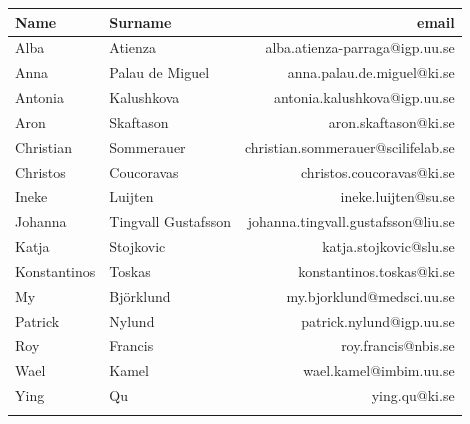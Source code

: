 \documentclass[12pt]{article}\usepackage[]{graphicx}\usepackage[]{color}
\makeatletter
\newcommand{\courseName}{ChIP-seq data analysis}
\newcommand{\courseLocation}{Stockholm}
\newcommand{\courseDate}{2018}
\newcommand{\courseLeaderA}{Olga Dethlefsen}
\newcommand{\courseEmailA}{olga.dethlefsen@nbis.se}
\newcommand{\courseLeaderB}{Agata Smialowska}
\newcommand{\courseEmailB}{agata.smialowska@nbis.se}
\makeatother
\begin{document}
\pagestyle{fancy}



% 

\newpage




\begin{table}[ht]
\centering
\begin{tabular}{llr}
  \toprule
Name & Surname & email \\ 
  \midrule
Alba & Atienza & alba.atienza-parraga@igp.uu.se \\ 
   \rowcolor[gray]{0.95}Anna & Palau de Miguel & anna.palau.de.miguel@ki.se \\ 
  Antonia & Kalushkova & antonia.kalushkova@igp.uu.se \\ 
   \rowcolor[gray]{0.95}Aron & Skaftason & aron.skaftason@ki.se \\ 
  Christian & Sommerauer & christian.sommerauer@scilifelab.se \\ 
   \rowcolor[gray]{0.95}Christos & Coucoravas & christos.coucoravas@ki.se \\ 
  Ineke & Luijten & ineke.luijten@su.se \\ 
   \rowcolor[gray]{0.95}Johanna & Tingvall Gustafsson & johanna.tingvall.gustafsson@liu.se \\ 
  Katja & Stojkovic & katja.stojkovic@slu.se \\ 
   \rowcolor[gray]{0.95}Konstantinos & Toskas & konstantinos.toskas@ki.se \\ 
  My & Björklund & my.bjorklund@medsci.uu.se \\ 
   \rowcolor[gray]{0.95}Patrick & Nylund & patrick.nylund@igp.uu.se \\ 
  Roy & Francis & roy.francis@nbis.se \\ 
   \rowcolor[gray]{0.95}Wael & Kamel & wael.kamel@imbim.uu.se \\ 
  Ying & Qu & ying.qu@ki.se \\ 
   \rowcolor[gray]{0.95} \bottomrule
\end{tabular}
\end{table}
\end{document}
